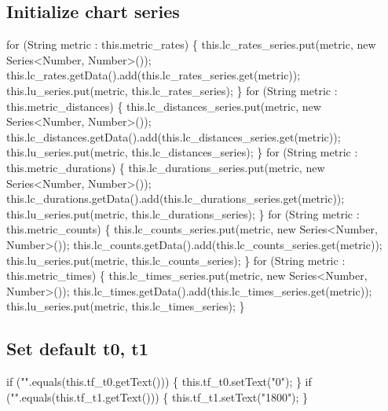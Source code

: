 \subsection{Initialize chart series}
\nwenddocs{}\endmoddef{}
for (String metric : this.metric_rates) \{
  this.lc_rates_series.put(metric, new Series<Number, Number>());
  this.lc_rates.getData().add(this.lc_rates_series.get(metric));
  this.lu_series.put(metric, this.lc_rates_series);
\}
for (String metric : this.metric_distances) \{
  this.lc_distances_series.put(metric, new Series<Number, Number>());
  this.lc_distances.getData().add(this.lc_distances_series.get(metric));
  this.lu_series.put(metric, this.lc_distances_series);
\}
for (String metric : this.metric_durations) \{
  this.lc_durations_series.put(metric, new Series<Number, Number>());
  this.lc_durations.getData().add(this.lc_durations_series.get(metric));
  this.lu_series.put(metric, this.lc_durations_series);
\}
for (String metric : this.metric_counts) \{
  this.lc_counts_series.put(metric, new Series<Number, Number>());
  this.lc_counts.getData().add(this.lc_counts_series.get(metric));
  this.lu_series.put(metric, this.lc_counts_series);
\}
for (String metric : this.metric_times) \{
  this.lc_times_series.put(metric, new Series<Number, Number>());
  this.lc_times.getData().add(this.lc_times_series.get(metric));
  this.lu_series.put(metric, this.lc_times_series);
\}
\nwendcode{}\nwdocspar

\subsection{Set default t0, t1}
\nwenddocs{}\endmoddef{}
if ("".equals(this.tf_t0.getText())) \{
  this.tf_t0.setText("0");
\}
if ("".equals(this.tf_t1.getText())) \{
  this.tf_t1.setText("1800");
\}
\nwendcode{}\nwdocspar

